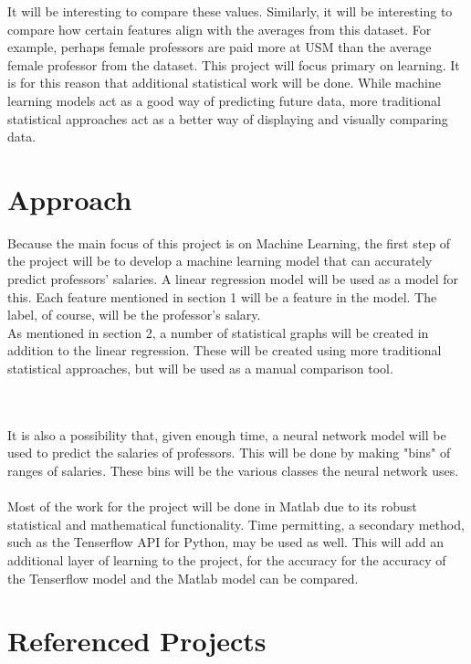 \documentclass[14pt, letterpaper]{extarticle}
\begin{document}
        It will be interesting to compare these values. Similarly, it will be interesting to compare how certain features align with the averages from this dataset. For example, perhaps female professors are paid more at USM than the average female professor from the dataset. 
        \bigskip
        This project will focus primary on learning. It is for this reason that additional statistical work will be done. While machine learning models act as a good way of predicting future data, more traditional statistical approaches act as a better way of displaying and visually comparing data.

        \pagebreak
        \section{Approach}
        Because the main focus of this project is on Machine Learning, the first step of the project will be to develop a machine learning model that can accurately predict professors' salaries. A linear regression model will be used as a model for this. Each feature mentioned in section 1 will be a feature in the model. The label, of course, will be the professor's salary. \\
        \bigskip
        As mentioned in section 2, a number of statistical graphs will be created in addition to the linear regression. These will be created using more traditional statistical approaches, but will be used as a manual comparison tool. 
        
        \\~\\
        It is also a possibility that, given enough time, a neural network model will be used to predict the salaries of professors. This will be done by making "bins" of ranges of salaries. These bins will be the various classes the neural network uses.
        \\~\\
        Most of the work for the project will be done in Matlab due to its robust statistical and mathematical functionality. Time permitting, a secondary method, such as the Tenserflow API for Python, may be used as well. This will add an additional layer of learning to the project, for the accuracy for the accuracy of the Tenserflow model and the Matlab model can be compared. 
        

        \pagebreak
        \section{Referenced Projects}
\end{document}
